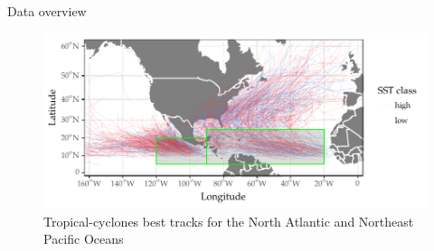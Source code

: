 \begin{frame}[label=intro-tc]{Data overview}
	\begin{figure}[H]
		\centering
		\includegraphics[width=\textwidth]{images/full-map}
		\caption{Tropical-cyclones best tracks for the North Atlantic and Northeast Pacific Oceans}
		\label{fig:full-map}
	\end{figure}

\end{frame}

